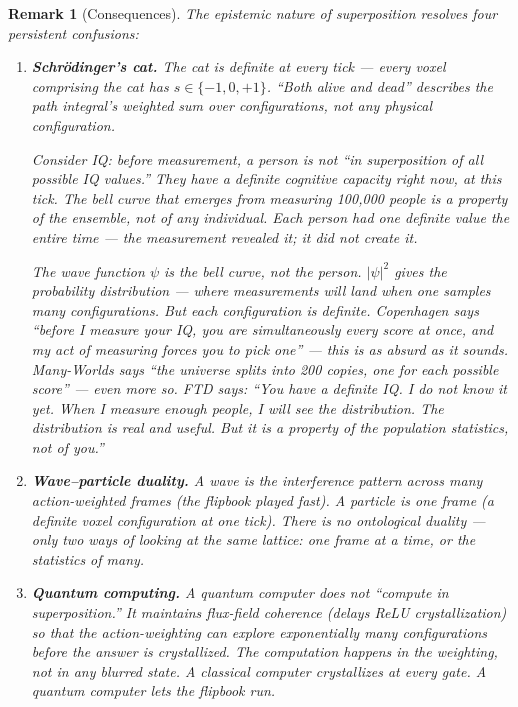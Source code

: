 \documentclass[11pt]{article}
\theoremstyle{tight}
\theoremstyle{plainroman}
\newtheorem{remark}[theorem]{Remark}
\begin{document}
\begin{remark}[Consequences]
The epistemic nature of superposition resolves four persistent confusions:

\begin{enumerate}[nosep]
\item \textbf{Schr\"odinger's cat.}
The cat is definite at every tick --- every voxel comprising the cat has $s\in\{-1,0,+1\}$.
``Both alive and dead'' describes the path integral's weighted sum over configurations, not any physical configuration.

Consider IQ: before measurement, a person is not ``in superposition of all possible IQ values.''
They have a definite cognitive capacity right now, at this tick.
The bell curve that emerges from measuring 100{,}000 people is a property of the \emph{ensemble}, not of any individual.
Each person had one definite value the entire time --- the measurement revealed it; it did not create it.

The wave function $\psi$ is the bell curve, not the person.
$|\psi|^2$ gives the probability distribution --- where measurements will land when one samples many configurations.
But each configuration is definite.
Copenhagen says ``before I measure your IQ, you are simultaneously every score at once, and my act of measuring forces you to pick one'' --- this is as absurd as it sounds.
Many-Worlds says ``the universe splits into 200 copies, one for each possible score'' --- even more so.
FTD says: ``You have a definite IQ. I do not know it yet.
When I measure enough people, I will see the distribution.
The distribution is real and useful.
But it is a property of the population statistics, not of you.''

\item \textbf{Wave--particle duality.}
A wave is the interference pattern across many action-weighted frames (the flipbook played fast).
A particle is one frame (a definite voxel configuration at one tick).
There is no ontological duality --- only two ways of looking at the same lattice: one frame at a time, or the statistics of many.

\item \textbf{Quantum computing.}
A quantum computer does not ``compute in superposition.''
It maintains flux-field coherence (delays ReLU crystallization) so that the action-weighting can explore exponentially many configurations before the answer is crystallized.
The computation happens in the \emph{weighting}, not in any blurred state.
A classical computer crystallizes at every gate.
A quantum computer lets the flipbook run.


\end{enumerate}
\end{remark}
\end{document}
